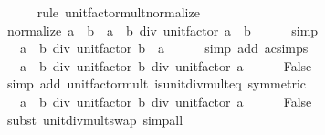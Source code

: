 \begin{isabellebody}
\ \ \ \ \isamarkupfalse%
\ {\isacharparenleft}{\kern0pt}rule\ unit{\isacharunderscore}{\kern0pt}factor{\isacharunderscore}{\kern0pt}mult{\isacharunderscore}{\kern0pt}normalize{\isacharparenright}{\kern0pt}\isanewline
\ \ \isamarkupfalse%
\ \isamarkupfalse%
\ {\isachardoublequoteopen}normalize\ {\isacharparenleft}{\kern0pt}a\ {\isacharasterisk}{\kern0pt}\ b{\isacharparenright}{\kern0pt}\ {\isacharequal}{\kern0pt}\ a\ {\isacharasterisk}{\kern0pt}\ b\ div\ unit{\isacharunderscore}{\kern0pt}factor\ {\isacharparenleft}{\kern0pt}a\ {\isacharasterisk}{\kern0pt}\ b{\isacharparenright}{\kern0pt}{\isachardoublequoteclose}\isanewline
\ \ \ \ \isamarkupfalse%
\ simp\isanewline
\ \ \isamarkupfalse%
\ \isamarkupfalse%
\ {\isachardoublequoteopen}{\isasymdots}\ {\isacharequal}{\kern0pt}\ a\ {\isacharasterisk}{\kern0pt}\ b\ div\ unit{\isacharunderscore}{\kern0pt}factor\ {\isacharparenleft}{\kern0pt}b\ {\isacharasterisk}{\kern0pt}\ a{\isacharparenright}{\kern0pt}{\isachardoublequoteclose}\isanewline
\ \ \ \ \isamarkupfalse%
\ {\isacharparenleft}{\kern0pt}simp\ add{\isacharcolon}{\kern0pt}\ ac{\isacharunderscore}{\kern0pt}simps{\isacharparenright}{\kern0pt}\isanewline
\ \ \isamarkupfalse%
\ \isamarkupfalse%
\ {\isachardoublequoteopen}{\isasymdots}\ {\isacharequal}{\kern0pt}\ a\ {\isacharasterisk}{\kern0pt}\ b\ div\ unit{\isacharunderscore}{\kern0pt}factor\ b\ div\ unit{\isacharunderscore}{\kern0pt}factor\ a{\isachardoublequoteclose}\isanewline
\ \ \ \ \isamarkupfalse%
\ False\ \isamarkupfalse%
\ {\isacharparenleft}{\kern0pt}simp\ add{\isacharcolon}{\kern0pt}\ unit{\isacharunderscore}{\kern0pt}factor{\isacharunderscore}{\kern0pt}mult\ is{\isacharunderscore}{\kern0pt}unit{\isacharunderscore}{\kern0pt}div{\isacharunderscore}{\kern0pt}mult{}{\isacharunderscore}{\kern0pt}eq\ {\isacharbrackleft}{\kern0pt}symmetric{\isacharbrackright}{\kern0pt}{\isacharparenright}{\kern0pt}\isanewline
\ \ \isamarkupfalse%
\ \isamarkupfalse%
\ {\isachardoublequoteopen}{\isasymdots}\ {\isacharequal}{\kern0pt}\ a\ {\isacharasterisk}{\kern0pt}\ {\isacharparenleft}{\kern0pt}b\ div\ unit{\isacharunderscore}{\kern0pt}factor\ b{\isacharparenright}{\kern0pt}\ div\ unit{\isacharunderscore}{\kern0pt}factor\ a{\isachardoublequoteclose}\isanewline
\ \ \ \ \isamarkupfalse%
\ False\ \isamarkupfalse%
\ {\isacharparenleft}{\kern0pt}subst\ unit{\isacharunderscore}{\kern0pt}div{\isacharunderscore}{\kern0pt}mult{\isacharunderscore}{\kern0pt}swap{\isacharparenright}{\kern0pt}\ simp{\isacharunderscore}{\kern0pt}all\isanewline

\end{isabellebody}
